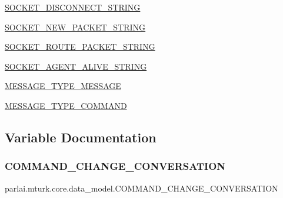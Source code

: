 \begin{DoxyCompactItemize}
\hyperlink{namespaceparlai_1_1mturk_1_1core_1_1data__model_a5fabd9fa49ff47ea751ed053dce85c27}{S\+O\+C\+K\+E\+T\+\_\+\+D\+I\+S\+C\+O\+N\+N\+E\+C\+T\+\_\+\+S\+T\+R\+I\+NG}
\item 
\hyperlink{namespaceparlai_1_1mturk_1_1core_1_1data__model_ad3966dbf2d2db4f2494d846f1316f6bd}{S\+O\+C\+K\+E\+T\+\_\+\+N\+E\+W\+\_\+\+P\+A\+C\+K\+E\+T\+\_\+\+S\+T\+R\+I\+NG}
\item 
\hyperlink{namespaceparlai_1_1mturk_1_1core_1_1data__model_a0c9250562d24e55b7cb5dec63ca49b3e}{S\+O\+C\+K\+E\+T\+\_\+\+R\+O\+U\+T\+E\+\_\+\+P\+A\+C\+K\+E\+T\+\_\+\+S\+T\+R\+I\+NG}
\item 
\hyperlink{namespaceparlai_1_1mturk_1_1core_1_1data__model_a67e68931174004c28f3a08b3d91ef8e3}{S\+O\+C\+K\+E\+T\+\_\+\+A\+G\+E\+N\+T\+\_\+\+A\+L\+I\+V\+E\+\_\+\+S\+T\+R\+I\+NG}
\item 
\hyperlink{namespaceparlai_1_1mturk_1_1core_1_1data__model_a596503398bf1ecddded14ff78d9a3a49}{M\+E\+S\+S\+A\+G\+E\+\_\+\+T\+Y\+P\+E\+\_\+\+M\+E\+S\+S\+A\+GE}
\item 
\hyperlink{namespaceparlai_1_1mturk_1_1core_1_1data__model_aeb79ffba49ff546f3c1e56cd3f801783}{M\+E\+S\+S\+A\+G\+E\+\_\+\+T\+Y\+P\+E\+\_\+\+C\+O\+M\+M\+A\+ND}
\end{DoxyCompactItemize}


\subsection{Variable Documentation}
\mbox{\label{namespaceparlai_1_1mturk_1_1core_1_1data__model_aa299eda497bd5fc8e6b867e19264bfbf}} 
\subsubsection{\texorpdfstring{C\+O\+M\+M\+A\+N\+D\+\_\+\+C\+H\+A\+N\+G\+E\+\_\+\+C\+O\+N\+V\+E\+R\+S\+A\+T\+I\+ON}{COMMAND\_CHANGE\_CONVERSATION}}
{\footnotesize\ttfamily parlai.\+mturk.\+core.\+data\+\_\+model.\+C\+O\+M\+M\+A\+N\+D\+\_\+\+C\+H\+A\+N\+G\+E\+\_\+\+C\+O\+N\+V\+E\+R\+S\+A\+T\+I\+ON}

